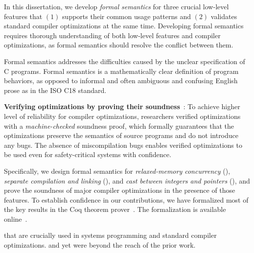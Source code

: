 In this dissertation, we develop \emph{formal semantics} for three crucial low-level features that
$(1)$ supports their common usage patterns and $(2)$ validates standard compiler optimizations at
the same time.  Developing formal semantics requires thorough understanding of both low-level
features and compiler optimizations, as formal semantics should resolve the conflict between them.

Formal semantics addresses the difficulties caused by the unclear specification of C programs.
Formal semantics is a mathematically clear definition of program behaviors, as opposed to informal
and often ambiguous and confusing English prose as in the ISO C18 standard.






\textbf{Verifying optimizations by proving their soundness}~\cite{compcert,vellvm}: To achieve
higher level of reliability for compiler optimizations, researchers verified optimizations with a
\emph{machine-checked} soundness proof, which formally guarantees that the optimizations preserve
the semantics of source programs and do not introduce any bugs.  The absence of miscompilation bugs
enables verified optimizations to be used even for safety-critical systems with confidence.



Specifically, we design formal semantics for \emph{relaxed-memory concurrency}
(), \emph{separate compilation and linking} (), and \emph{cast
  between integers and pointers} (), and prove the soundness of major compiler
optimizations in the presence of those features.  To establish confidence in our contributions, we
have formalized most of the key results in the Coq theorem prover~\cite{coq}.  The formalization is
available online~\cite{kang-phd-thesis-web}.

that are crucially used in systems programming and standard compiler optimizations. and yet were
beyond the reach of the prior work.



